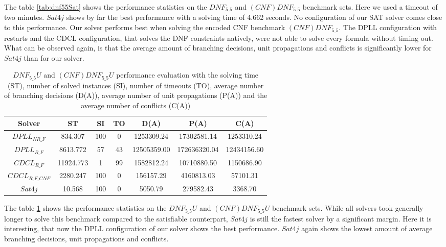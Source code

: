 The table \ref{tab:dnf55Sat} shows the performance statistics on the $DNF_{5\_5}$ and $(CNF)DNF_{5\_5}$ benchmark sets. Here we used a timeout of two minutes. $Sat4j$ shows by far the best performance with a solving time of 4.662 seconds. No configuration of our SAT solver comes close to this performance. Our solver performs best when solving the encoded CNF benchmark $(CNF)DNF_{5\_5}$. The DPLL configuration with restarts and the CDCL configuration, that solves the DNF constraints natively, were not able to solve every formula without timing out. What can be observed again, is that the average amount of branching decisions, unit propagations and conflicts is significantly lower for $Sat4j$ than for our solver.


\begin{table}[!htb]
\centering
\caption[$DNF_{5\_5}U$ and $(CNF)DNF_{5\_5}U$ performance evaluation]{$DNF_{5\_5}U$ and $(CNF)DNF_{5\_5}U$ performance evaluation with the solving time (ST), number of solved instances (SI), number of timeouts (TO), average number of branching decisions (D(A)), average number of unit propagations (P(A)) and the average number of conflicts (C(A))}
\label{tab:dnf55Unsat}
\begin{tabular}{|c|c|c|c|c|c|c|}
\hline
Solver & ST & SI & TO & D(A) & P(A) & C(A)\\ 
\hline
$DPLL_{NR\_F}$ & 834.307 & 100 & 0 & 1253309.24 & 17302581.14 & 1253310.24 \\ 
\hline
$DPLL_{R\_F}$ & 8613.772 & 57 & 43 & 12505359.00 & 172636320.04 & 12434156.60 \\ 
\hline
$CDCL_{R\_F}$ & 11924.773 & 1 & 99 & 1582812.24 & 10710880.50 & 1150686.90 \\ 
\hline
$CDCL_{R\_F\_CNF}$ & 2280.247 & 100 & 0 & 156157.29 & 4160813.03 & 57101.31 \\ 
\hline
$Sat4j$ & 10.568 & 100 & 0 & 5050.79 & 279582.43 & 3368.70 \\ 
\hline
\end{tabular}
\end{table}

The table \ref{tab:dnf55Unsat} shows the performance statistics on the $DNF_{5\_5}U$ and $(CNF)DNF_{5\_5}U$ benchmark sets. While all solvers took generally longer to solve this benchmark compared to the satisfiable counterpart, $Sat4j$ is still the fastest solver by a significant margin. Here it is interesting, that now the DPLL configuration of our solver shows the best performance. $Sat4j$ again shows the lowest amount of average branching decisions, unit propagations and conflicts.

